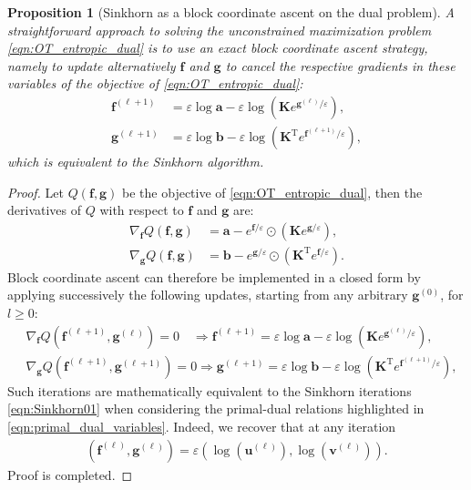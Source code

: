 \documentclass[11pt]{book}
\newtheorem{proposition}[theorem]{Proposition}
\begin{document}
\begin{proposition}[Sinkhorn as a block coordinate ascent on the dual problem]
    A straightforward approach to solving the unconstrained maximization problem \eqref{eqn:OT_entropic_dual} is to use an exact block coordinate ascent strategy, namely to update alternatively $\mathbf{f}$ and $\mathbf{g}$ to cancel the respective gradients in these variables of the objective of \eqref{eqn:OT_entropic_dual}:
    \begin{align*}
        \mathbf{f}^{(\ell+1)} &= \varepsilon \log \mathbf{a} - \varepsilon \log \left( \mathbf{K} e^{\mathbf{g}^{(\ell)} / \varepsilon} \right), \\
        \mathbf{g}^{(\ell+1)} &= \varepsilon \log \mathbf{b} - \varepsilon \log \left( \mathbf{K}^{\mathrm{T}} e^{\mathbf{f}^{(\ell+1)} / \varepsilon} \right),
    \end{align*}
    which is equivalent to the Sinkhorn algorithm.
\end{proposition}

\begin{proof}
    Let $Q(\mathbf{f}, \mathbf{g})$ be the objective of \eqref{eqn:OT_entropic_dual}, then the derivatives of $Q$ with respect to $\mathbf{f}$ and $\mathbf{g}$ are:
    \begin{align*}
        \nabla_{\mathbf{f}} Q(\mathbf{f}, \mathbf{g}) &= \mathbf{a} - e^{\mathbf{f} / \varepsilon} \odot (\mathbf{K} e^{\mathbf{g} / \varepsilon}), \\
        \nabla_{\mathbf{g}} Q(\mathbf{f}, \mathbf{g}) &= \mathbf{b} - e^{\mathbf{g} / \varepsilon} \odot (\mathbf{K}^{\mathrm{T}} e^{\mathbf{f} / \varepsilon}).
    \end{align*}
    Block coordinate ascent can therefore be implemented in a closed form by applying 
    successively the following updates, starting from any arbitrary $\mathbf{g}^{(0)}$, for $l \geq 0$:
    \begin{align*}
        &\nabla_{\mathbf{f}} Q(\mathbf{f}^{(\ell+1)}, \mathbf{g}^{(\ell)}) = 0 \quad \Rightarrow \mathbf{f}^{(\ell+1)} = \varepsilon \log \mathbf{a} - \varepsilon \log \left( \mathbf{K} e^{\mathbf{g}^{(\ell)} / \varepsilon} \right),\\
        &\nabla_{\mathbf{g}} Q(\mathbf{f}^{(\ell+1)}, \mathbf{g}^{(\ell+1)}) = 0 \Rightarrow  \mathbf{g}^{(\ell+1)} = \varepsilon \log \mathbf{b} - \varepsilon \log \left( \mathbf{K}^{\mathrm{T}} e^{\mathbf{f}^{(\ell+1)} / \varepsilon} \right),
    \end{align*}
    Such iterations are mathematically equivalent to the Sinkhorn iterations \eqref{eqn:Sinkhorn01} when considering the primal-dual relations highlighted in \eqref{eqn:primal_dual_variables}. Indeed, we recover that at any iteration
    \begin{align*}
        (\mathbf{f}^{(\ell)}, \mathbf{g}^{(\ell)}) = \varepsilon (\log (\mathbf{u}^{(\ell)}), \log (\mathbf{v}^{(\ell)})).
    \end{align*}
    Proof is completed.
\end{proof}
\end{document}
